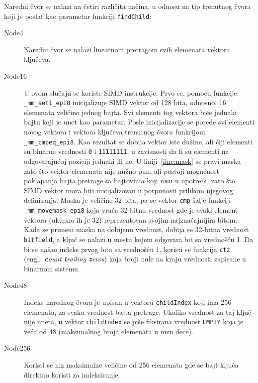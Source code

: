 \documentclass[12pt,oneside]{memoir}
\begin{document}
Naredni čvor se nalazi na četiri različita načina, u odnosu na
tip trenutnog čvora koji je poslat kao parametar funkciji
\texttt{findChild}:

\begin{description}
  \item[Node4] Naredni čvor se nalazi linearnom
        pretragom svih elemenata
        vektora ključeva.
  \item[Node16] U ovom slučaju se koriste SIMD instrukcije.
        Prvo se, pomoću funkcije \texttt{\_mm\_set1\_epi8} inicijalizuje
        SIMD vektor od 128 bita, odnosno, 16 elemenata veličine jednog bajta. Svi
        elementi tog vektora biće jednaki bajtu koji je unet kao parametar.
        Posle inicijalizacije se porede svi elementi novog vektora i
        vektora ključeva trenutnog čvora funkcijom
        \texttt{\_mm\_cmpeq\_epi8}. Kao rezultat se dobija vektor iste
        dužine, ali čiji elementi su binarne vrednosti \texttt{0}
        i \texttt{11111111}, u zavisnosti da li su elementi na odgovarajućoj
        poziciji jednaki ili ne. U liniji~\ref{line:mask} se pravi
        maska zato što vektor elemenata nije nužno pun, ali postoji
        mogućnost poklapanja bajta pretrage sa bajtovima koji nisu
        u upotrebi, zato što SIMD vektor mora biti inicijalizovan
        u potpunosti prilikom njegovog definisanja.
        Maska je veličine
        32 bita, pa se vektor \texttt{cmp} šalje funkciji
        \texttt{\_mm\_movemask\_epi8} koja vraća 32-bitnu vrednost
        gde je svaki element vektora (ukupno ih je 32) reprezentovan
        svojim najznačajnijim bitom. Kada se primeni maska na dobijenu
        vrednost, dobija se 32-bitna vrednost \texttt{bitfield},
        a ključ se nalazi u mestu kojem odgovara bit sa vrednošću
        1. Da bi se našao indeks prvog bita sa vrednošću 1, koristi
        se funkcija \texttt{ctz}
        (engl.\ \textit{\textbf{c}ount \textbf{t}railing \textbf{z}eros})
        koja broji nule na kraju vrednosti zapisane u binarnom
        sistemu.
  \item[Node48] Indeks narednog čvora je upisan u vektoru
        \texttt{childIndex} koji ima 256 elemenata, za svaku
        vrednost bajta pretrage. Ukoliko vrednost za
        taj ključ nije uneta,
        u vektor \texttt{childIndex} se piše fiksirana
        vrednost \texttt{EMPTY} koja je veća od 48 (maksimalnog
        broja elemenata u nizu dece).
  \item[Node256] Koristi se niz maksimalne veličine od 256 elemenata
        gde se bajt ključa direktno koristi za indeksiranje.
\end{description}
\end{document}
